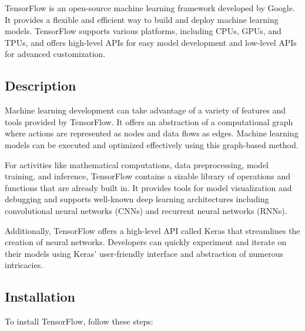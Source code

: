 TensorFlow is an open-source machine learning framework developed by Google. It provides a flexible and efficient way to build and deploy machine learning models. TensorFlow supports various platforms, including CPUs, GPUs, and TPUs, and offers high-level APIs for easy model development and low-level APIs for advanced customization.

\subsection{Description}


Machine learning development can take advantage of a variety of features and tools provided by TensorFlow. It offers an abstraction of a computational graph where actions are represented as nodes and data flows as edges. Machine learning models can be executed and optimized effectively using this graph-based method.

\vspace{8pt}	
For activities like mathematical computations, data preprocessing, model training, and inference, TensorFlow contains a sizable library of operations and functions that are already built in. It provides tools for model visualization and debugging and supports well-known deep learning architectures including convolutional neural networks (CNNs) and recurrent neural networks (RNNs).

\vspace{8pt}
Additionally, TensorFlow offers a high-level API called Keras that streamlines the creation of neural networks. Developers can quickly experiment and iterate on their models using Keras' user-friendly interface and abstraction of numerous intricacies. 

\subsection{Installation}

To install TensorFlow, follow these steps:

